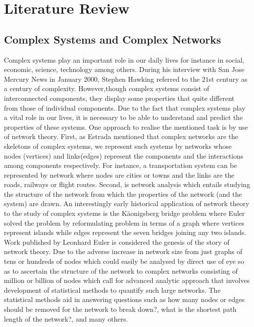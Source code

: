 \documentclass[10pt,a4paper]{article}
\begin{document}
	\newpage
	\section{Literature Review}
	\subsection{Complex Systems and Complex Networks}
	Complex systems play an important role in our daily lives for instance in social, economic, science, technology among others.  During his interview with San Jose Mercury News in January 2000, Stephen Hawking referred to the $21$st century as a century of complexity. However,though complex systems consist of interconnected components, they display some properties that quite different from those of individual components.  Due to the fact that complex systems play a vital role in our lives, it is necessary to be able to understand and predict the properties of these systems. One approach to realise the mentioned task is by use of network theory. First, as Estrada \citep{estrada2015first} mentioned that complex networks are the skeletons of complex systems, we represent such systems by networks whose nodes (vertices) and links(edges) represent the components and the interactions among components respectively. For instance, a transportation system can be represented by network where nodes are cities or towns and the links are the roads, railways or flight routes.  Second, is network analysis which entails studying the structure of the network from which the properties of the network (and the system) are drawn.
	An interestingly early historical application of network theory to the study of complex systems is the K\"{a}onigsberg bridge problem where Euler \citep{euler1976solution;euler1953leonhard} solved the problem by reformulating problem in terms of a graph where vertices represent islands while edges represent the seven bridges joining any two islands. Work published by Leonhard Euler \citep{euler1976solution} is considered the genesis of the story of network theory.
	Due to the adverse increase in network size from just graphs of tens or hundreds of nodes which could easily be analysed by direct use of eye so as to ascertain the structure of the network  to complex networks consisting of million or billion of nodes which call for advanced analytic approach that involves development of statistical methods to quantify such large networks. The statistical methods aid in answering questions such as how many nodes or edges should be removed for the network to break down?, what is the shortest path length of the network?, and many others. 
	
\end{document}
